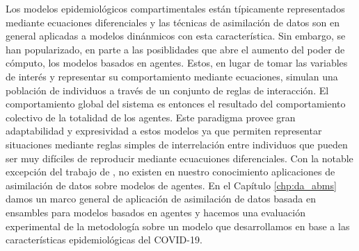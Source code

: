 Los modelos epidemiológicos compartimentales están típicamente representados mediante ecuaciones diferenciales y las técnicas de asimilación de datos son en general aplicadas a modelos dinánmicos con esta característica. Sin embargo, se han popularizado, en parte a las posiblidades que abre el aumento del poder de cómputo, los modelos basados en agentes. Estos, en lugar de tomar las variables de interés y representar su comportamiento mediante ecuaciones, simulan una población de individuos a través de un conjunto de reglas de interacción. El comportamiento global del sistema es entonces el resultado del comportamiento colectivo de la totalidad de los agentes. Este paradigma provee gran adaptabilidad y expresividad a estos modelos ya que permiten representar situaciones mediante reglas simples de interrelación entre individuos que pueden ser muy difíciles de reproducir mediante ecuacuiones diferenciales. Con la notable excepción del trabajo de \cite{Ward2016}, no existen en nuestro conocimiento aplicaciones de asimilación de datos sobre modelos de agentes. En el Capítulo \ref{chp:da_abms} damos un marco general de aplicación de asimilación de datos basada en ensambles para modelos basados en agentes y hacemos una evaluación experimental de la metodología sobre un modelo que desarrollamos en base a las características epidemiológicas del COVID-19.
